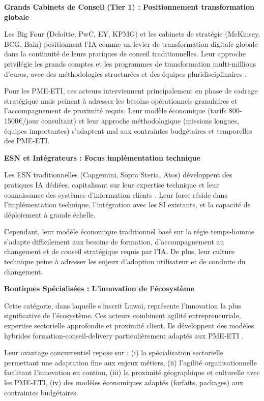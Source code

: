 \textbf{Grands Cabinets de Conseil (Tier 1) : Positionnement transformation globale}

Les Big Four (Deloitte, PwC, EY, KPMG) et les cabinets de stratégie (McKinsey, BCG, Bain) positionnent l'IA comme un levier de transformation digitale globale dans la continuité de leurs pratiques de conseil traditionnelles. Leur approche privilégie les grands comptes et les programmes de transformation multi-millions d'euros, avec des méthodologies structurées et des équipes pluridisciplinaires \cite{mckinsey2024ai_transformation}.

Pour les PME-ETI, ces acteurs interviennent principalement en phase de cadrage stratégique mais peinent à adresser les besoins opérationnels granulaires et l'accompagnement de proximité requis. Leur modèle économique (tarifs 800-1500€/jour consultant) et leur approche méthodologique (missions longues, équipes importantes) s'adaptent mal aux contraintes budgétaires et temporelles des PME-ETI.

\textbf{ESN et Intégrateurs : Focus implémentation technique}

Les ESN traditionnelles (Capgemini, Sopra Steria, Atos) développent des pratiques IA dédiées, capitalisant sur leur expertise technique et leur connaissance des systèmes d'information clients \cite{syntec2024digital}. Leur force réside dans l'implémentation technique, l'intégration avec les SI existants, et la capacité de déploiement à grande échelle.

Cependant, leur modèle économique traditionnel basé sur la régie temps-homme s'adapte difficilement aux besoins de formation, d'accompagnement au changement et de conseil stratégique requis par l'IA. De plus, leur culture technique peine à adresser les enjeux d'adoption utilisateur et de conduite du changement.

\textbf{Boutiques Spécialisées : L'innovation de l'écosystème}

Cette catégorie, dans laquelle s'inscrit Luwai, représente l'innovation la plus significative de l'écosystème. Ces acteurs combinent agilité entrepreneuriale, expertise sectorielle approfondie et proximité client. Ils développent des modèles hybrides formation-conseil-delivery particulièrement adaptés aux PME-ETI \cite{luwai2025meetings}.

Leur avantage concurrentiel repose sur : (i) la spécialisation sectorielle permettant une adaptation fine aux enjeux métiers, (ii) l'agilité organisationnelle facilitant l'innovation en continu, (iii) la proximité géographique et culturelle avec les PME-ETI, (iv) des modèles économiques adaptés (forfaits, packages) aux contraintes budgétaires.

